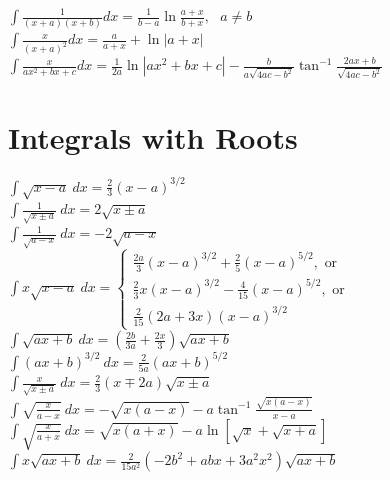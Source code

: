 \documentclass[10pt,letterpaper,landscape]{cheatsheet}
\begin{document}
$
\int \frac{1}{(x+a)(x+b)}dx = \frac{1}{b-a}\ln\frac{a+x}{b+x}, \text{ } a\ne b
$\\

$
\int \frac{x}{(x+a)^2}dx = \frac{a}{a+x}+\ln |a+x|
$\\


$
\int \frac{x}{ax^2+bx+c}dx = \frac{1}{2a}\ln|ax^2+bx+c| 
-\frac{b}{a\sqrt{4ac-b^2}}\tan^{-1}\frac{2ax+b}{\sqrt{4ac-b^2}}
$\\

\section*{Integrals with Roots}

$
\int \sqrt{x-a}\ dx = \frac{2}{3}(x-a)^{3/2}
$\\



$
\int \frac{1}{\sqrt{x\pm a}}\ dx = 2\sqrt{x\pm a} 
$\\

$
\int \frac{1}{\sqrt{a-x}}\ dx = -2\sqrt{a-x} 
$\\


$
\int x\sqrt{x-a}\ dx =  
\left\{
\begin{array}{l}
\frac{2 a}{3} \left({x-a}\right)^{3/2} +\frac{2 }{5}\left( {x-a}\right)^{5/2},\text{ or} 
\\ \frac{2}{3} x(x-a)^{3/2} - \frac{4}{15} (x-a)^{5/2}, \text{ or}
\\ \frac{2}{15}(2a+3x)(x-a)^{3/2}
\end{array}
\right.
$\\

$
\int \sqrt{ax+b}\ dx = \left(\frac{2b}{3a}+\frac{2x}{3}\right)\sqrt{ax+b} 
$\\

$
\int (ax+b)^{3/2}\ dx =\frac{2}{5a}(ax+b)^{5/2}
$\\

$
\int \frac{x}{\sqrt{x\pm a} } \ dx = \frac{2}{3}(x\mp 2a)\sqrt{x\pm a}
$\\

$
\int \sqrt{\frac{x}{a-x}}\ dx =  -\sqrt{x(a-x)}
-a\tan^{-1}\frac{\sqrt{x(a-x)}}{x-a}
$\\

$
\int \sqrt{\frac{x}{a+x}}\ dx =  \sqrt{x(a+x)} 
-a\ln \left[ \sqrt{x} + \sqrt{x+a}\right] 
$\\

$
\int x \sqrt{ax + b}\ dx =
\frac{2}{15 a^2}(-2b^2+abx + 3 a^2 x^2)
\sqrt{ax+b}
$\\
\end{document}
